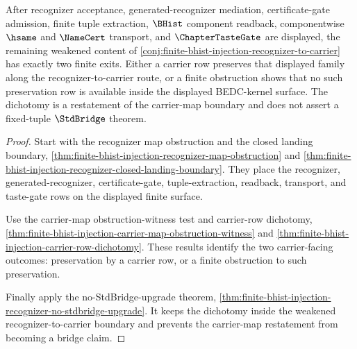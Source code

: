 \begin{theorem}
\label{thm:finite-bhist-injection-carrier-map-compatibility-dichotomy}
After recognizer acceptance, generated-recognizer mediation, certificate-gate admission, finite tuple extraction, $\BHist$ component readback, componentwise $\hsame$ and $\NameCert$ transport, and $\ChapterTasteGate$ are displayed, the remaining weakened content of \autoref{conj:finite-bhist-injection-recognizer-to-carrier} has exactly two finite exits. Either a carrier row preserves that displayed family along the recognizer-to-carrier route, or a finite obstruction shows that no such preservation row is available inside the displayed BEDC-kernel surface. The dichotomy is a restatement of the carrier-map boundary and does not assert a fixed-tuple $\StdBridge$ theorem.
\end{theorem}
\begin{proof}
Start with the recognizer map obstruction and the closed landing boundary, \autoref{thm:finite-bhist-injection-recognizer-map-obstruction} and \autoref{thm:finite-bhist-injection-recognizer-closed-landing-boundary}. They place the recognizer, generated-recognizer, certificate-gate, tuple-extraction, readback, transport, and taste-gate rows on the displayed finite surface.

Use the carrier-map obstruction-witness test and carrier-row dichotomy, \autoref{thm:finite-bhist-injection-carrier-map-obstruction-witness} and \autoref{thm:finite-bhist-injection-carrier-row-dichotomy}. These results identify the two carrier-facing outcomes: preservation by a carrier row, or a finite obstruction to such preservation.

Finally apply the no-StdBridge-upgrade theorem, \autoref{thm:finite-bhist-injection-recognizer-no-stdbridge-upgrade}. It keeps the dichotomy inside the weakened recognizer-to-carrier boundary and prevents the carrier-map restatement from becoming a bridge claim.
\end{proof}

